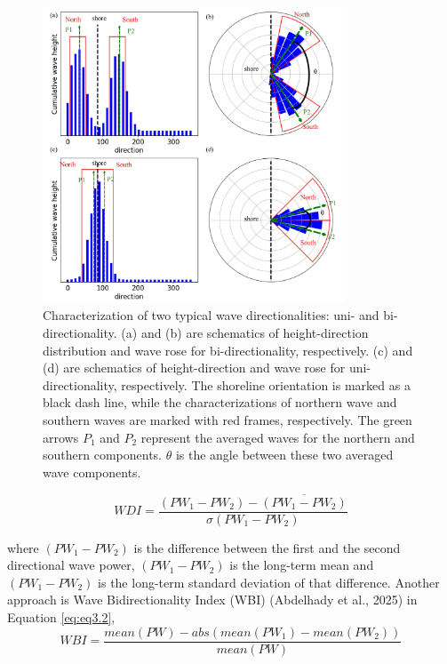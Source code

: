 \begin{figure}[htbp]
  \centering
  \includegraphics[width=0.8\textwidth]{chapter3/resources/figure3-2.jpg}
  \caption{Characterization of two typical wave directionalities: uni- and bi-directionality. (a) and (b) are schematics of height-direction distribution and wave rose for bi-directionality, respectively. (c) and (d) are schematics of height-direction and wave rose for uni-directionality, respectively. The shoreline orientation is marked as a black dash line, while the characterizations of northern wave and southern waves are marked with red frames, respectively. The green arrows $P_1$ and $P_2$ represent the averaged waves for the northern and southern components. $\theta$ is the angle between these two averaged wave components.}
  \label{fig:fig3.2}
\end{figure}

\begin{equation}
    WDI = \frac{(PW_1-PW_2) - \overline{(PW_1-PW_2)}}{\sigma(PW_1-PW_2)}
\label{eq:eq3.1}
\end{equation}

where $(PW_1-PW_2)$ is the difference between the first and the second directional wave power, $(PW_1-PW_2)$ is the long-term mean and $(PW_1-PW_2)$ is the long-term standard deviation of that difference. Another approach is Wave Bidirectionality Index (WBI) (Abdelhady et al., 2025) in Equation \ref{eq:eq3.2},
\begin{equation}
    WBI = \frac{mean(PW) - abs(mean(PW_1)-mean(PW_2))}{mean(PW)}
\label{eq:eq3.2}
\end{equation}

